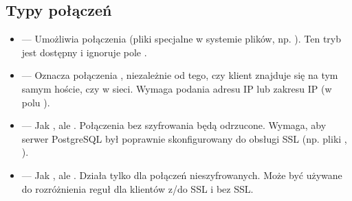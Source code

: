 \documentclass[a4paper,11pt,polish]{sphinxmanual}
\begin{document}
\subsection{Typy połączeń}
\label{\detokenize{Bezpieczenstwo/index:typy-polaczen}}\begin{itemize}
\item {} 
\sphinxAtStartPar
{} — Umożliwia połączenia  (pliki specjalne w systemie plików, np. ).
Ten tryb jest dostępny  i ignoruje pole .

\item {} 
\sphinxAtStartPar
{} — Oznacza połączenia , niezależnie od tego, czy klient znajduje się na tym samym hoście, czy w sieci.
Wymaga podania adresu IP lub zakresu IP (w polu ).

\item {} 
\sphinxAtStartPar
{} — Jak , ale . Połączenia bez szyfrowania będą odrzucone.
Wymaga, aby serwer PostgreSQL był poprawnie skonfigurowany do obsługi SSL (np. pliki , ).

\item {} 
\sphinxAtStartPar
{} — Jak , ale . Działa tylko dla połączeń nieszyfrowanych.
Może być używane do rozróżnienia reguł dla klientów z/do SSL i bez SSL.

\end{itemize}
\end{document}
